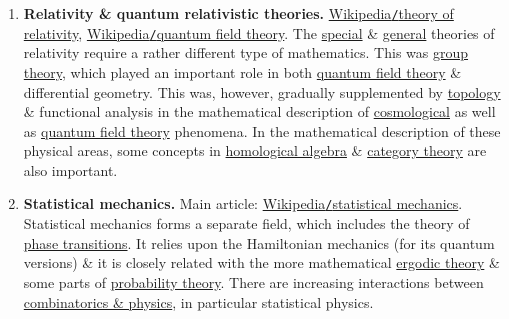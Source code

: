 \documentclass{article}
\begin{document}
\begin{enumerate}
	\item {\bf Relativity \& quantum relativistic theories.} \href{https://en.wikipedia.org/wiki/Theory_of_relativity}{Wikipedia{\tt/}theory of relativity}, \href{https://en.wikipedia.org/wiki/Quantum_field_theory}{Wikipedia{\tt/}quantum field theory}. The \href{https://en.wikipedia.org/wiki/Special_relativity}{special} \& \href{https://en.wikipedia.org/wiki/General_relativity}{general} theories of relativity require a rather different type of mathematics. This was \href{https://en.wikipedia.org/wiki/Group_theory}{group theory}, which played an important role in both \href{https://en.wikipedia.org/wiki/Quantum_field_theory}{quantum field theory} \& differential geometry. This was, however, gradually supplemented by \href{https://en.wikipedia.org/wiki/Topology}{topology} \& functional analysis in the mathematical description of \href{https://en.wikipedia.org/wiki/Physical_cosmology}{cosmological} as well as \href{https://en.wikipedia.org/wiki/Quantum_field_theory}{quantum field theory} phenomena. In the mathematical description of these physical areas, some concepts in \href{https://en.wikipedia.org/wiki/Homological_algebra}{homological algebra} \& \href{https://en.wikipedia.org/wiki/Category_theory}{category theory} are also important.
	\item {\bf Statistical mechanics.} Main article: \href{https://en.wikipedia.org/wiki/Statistical_mechanics}{Wikipedia{\tt/}statistical mechanics}. Statistical mechanics forms a separate field, which includes the theory of \href{https://en.wikipedia.org/wiki/Phase_transition}{phase transitions}. It relies upon the Hamiltonian mechanics (for its quantum versions) \& it is closely related with the more mathematical \href{https://en.wikipedia.org/wiki/Ergodic_theory}{ergodic theory} \& some parts of \href{https://en.wikipedia.org/wiki/Probability_theory}{probability theory}. There are increasing interactions between \href{https://en.wikipedia.org/wiki/Combinatorics_and_physics}{combinatorics \& physics}, in particular statistical physics.
\end{enumerate}
\end{document}
